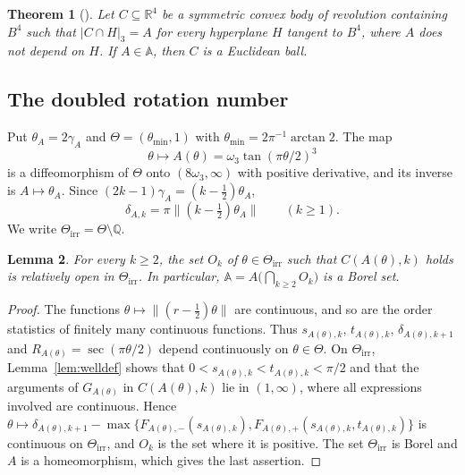 \documentclass{amsart}
\newtheorem{theorem}{Theorem}[section]
\newtheorem{lemma}[theorem]{Lemma}
\theoremstyle{definition}
\theoremstyle{remark}
\numberwithin{equation}{section}
\newcommand{\R}{\mathbb{R}}
\newcommand{\Q}{\mathbb{Q}}
\newcommand{\AAA}{\mathbb{A}}
\newcommand{\norm}[1]{\lVert #1 \rVert}
\newcommand{\meas}[1]{\lvert #1 \rvert}
\begin{document}
\begin{theorem}[{\cite[Theorem~9]{HR}}]\label{thm:HR9}
Let $C\subseteq\R^4$ be a symmetric convex body of revolution containing $B^4$ such that $\meas{C\cap H}_3=A$ for every hyperplane $H$ tangent to $B^4$, where $A$ does not depend on $H$. If $A\in\AAA$, then $C$ is a Euclidean ball.
\end{theorem}

\subsection{The doubled rotation number}
Put $\theta_A=2\gamma_A$ and $\Theta=(\theta_{\min},1)$ with $\theta_{\min}=2\pi^{-1}\arctan2$. The map
\[
\theta\longmapsto A(\theta)=\omega_3\tan(\pi\theta/2)^3
\]
is a diffeomorphism of $\Theta$ onto $(8\omega_3,\infty)$ with positive derivative, and its inverse is $A\mapsto\theta_A$. Since $(2k-1)\gamma_A=(k-\frac12)\theta_A$,
\begin{equation}\label{eq:deltatheta}
\delta_{A,k}=\pi\norm{(k-\tfrac12)\theta_A}\qquad(k\ge1).
\end{equation}
We write $\Theta_{\mathrm{irr}}=\Theta\setminus\Q$.

\begin{lemma}\label{lem:open}
For every $k\ge2$, the set $O_k$ of $\theta\in\Theta_{\mathrm{irr}}$ such that $C(A(\theta),k)$ holds is relatively open in $\Theta_{\mathrm{irr}}$. In particular, $\AAA=A\bigl(\bigcap_{k\ge2}O_k\bigr)$ is a Borel set.
\end{lemma}

\begin{proof}
The functions $\theta\mapsto\norm{(r-\frac12)\theta}$ are continuous, and so are the order statistics of finitely many continuous functions. Thus $s_{A(\theta),k}$, $t_{A(\theta),k}$, $\delta_{A(\theta),k+1}$ and $R_{A(\theta)}=\sec(\pi\theta/2)$ depend continuously on $\theta\in\Theta$. On $\Theta_{\mathrm{irr}}$, Lemma~\ref{lem:welldef} shows that $0<s_{A(\theta),k}<t_{A(\theta),k}<\pi/2$ and that the arguments of $G_{A(\theta)}$ in $C(A(\theta),k)$ lie in $(1,\infty)$, where all expressions involved are continuous. Hence $\theta\mapsto\delta_{A(\theta),k+1}-\max\{F_{A(\theta),-}(s_{A(\theta),k}),F_{A(\theta),+}(s_{A(\theta),k},t_{A(\theta),k})\}$ is continuous on $\Theta_{\mathrm{irr}}$, and $O_k$ is the set where it is positive. The set $\Theta_{\mathrm{irr}}$ is Borel and $A$ is a homeomorphism, which gives the last assertion.
\end{proof}
\end{document}
